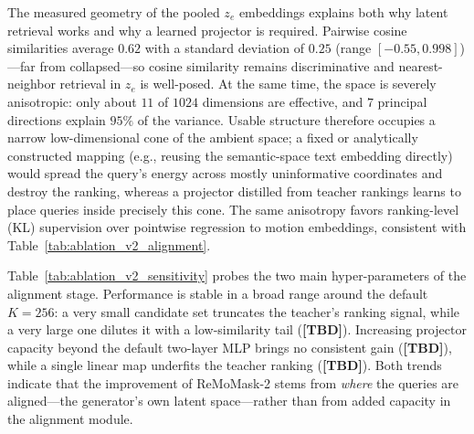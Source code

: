 \noindent {}
The measured geometry of the pooled $z_e$ embeddings explains both why latent retrieval works and why a learned projector is required. Pairwise cosine similarities average $0.62$ with a standard deviation of $0.25$ (range $[-0.55, 0.998]$)---far from collapsed---so cosine similarity remains discriminative and nearest-neighbor retrieval in $z_e$ is well-posed. At the same time, the space is severely anisotropic: only about $11$ of $1024$ dimensions are effective, and $7$ principal directions explain $95\%$ of the variance. Usable structure therefore occupies a narrow low-dimensional cone of the ambient space; a fixed or analytically constructed mapping (e.g., reusing the semantic-space text embedding directly) would spread the query's energy across mostly uninformative coordinates and destroy the ranking, whereas a projector distilled from teacher rankings learns to place queries inside precisely this cone. The same anisotropy favors ranking-level (KL) supervision over pointwise regression to motion embeddings, consistent with Table~\ref{tab:ablation_v2_alignment}.

\noindent {}
Table~\ref{tab:ablation_v2_sensitivity} probes the two main hyper-parameters of the alignment stage. Performance is stable in a broad range around the default $K{=}256$: a very small candidate set truncates the teacher's ranking signal, while a very large one dilutes it with a low-similarity tail (\textbf{[TBD]}). Increasing projector capacity beyond the default two-layer MLP brings no consistent gain (\textbf{[TBD]}), while a single linear map underfits the teacher ranking (\textbf{[TBD]}). Both trends indicate that the improvement of ReMoMask-2 stems from \emph{where} the queries are aligned---the generator's own latent space---rather than from added capacity in the alignment module.

